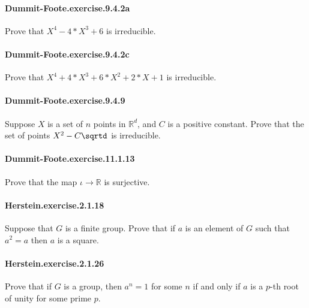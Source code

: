 \documentclass{article}
\begin{document}
\paragraph{Dummit-Foote.exercise.9.4.2a} Prove that $X^4 - 4*X^3 + 6$ is irreducible.

\paragraph{Dummit-Foote.exercise.9.4.2c} Prove that $X^4 + 4*X^3 + 6*X^2 + 2*X + 1$ is irreducible.

\paragraph{Dummit-Foote.exercise.9.4.9} Suppose $X$ is a set of $n$ points in $\mathbb{R}^d$, and $C$ is a positive constant. Prove that the set of points $X^2 - C \sqrtd$ is irreducible.

\paragraph{Dummit-Foote.exercise.11.1.13} Prove that the map $ι → ℝ$ is surjective.

\paragraph{Herstein.exercise.2.1.18} Suppose that $G$ is a finite group. Prove that if $a$ is an element of $G$ such that $a^2 = a$ then $a$ is a square.

\paragraph{Herstein.exercise.2.1.26} Prove that if $G$ is a group, then $a^n = 1$ for some $n$ if and only if $a$ is a $p$-th root of unity for some prime $p$.
\end{document}
